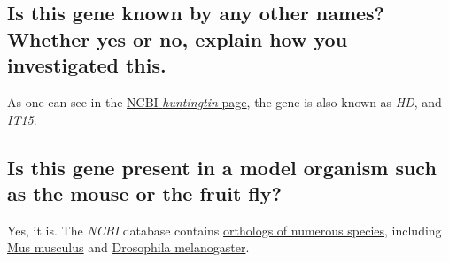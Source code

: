 \medskip


\subsection{Is this gene known by any other names? Whether yes or no, explain how you investigated this.}

As one can see in the \href{https://www.ncbi.nlm.nih.gov/gene/3064}{NCBI \textit{huntingtin} page}, the gene is also known as \textit{HD}, and \textit{IT15}.

\medskip


\subsection{Is this gene present in a model organism such as the mouse or the fruit fly?}

Yes, it is. The \textit{NCBI} database contains \href{https://www.ncbi.nlm.nih.gov/gene/?Term=ortholog_gene_3064[group]}{orthologs of numerous species}, including \href{https://www.ncbi.nlm.nih.gov/gene/15194}{Mus musculus} and \href{https://www.ncbi.nlm.nih.gov/gene/43392}{Drosophila melanogaster}.

\newpage
